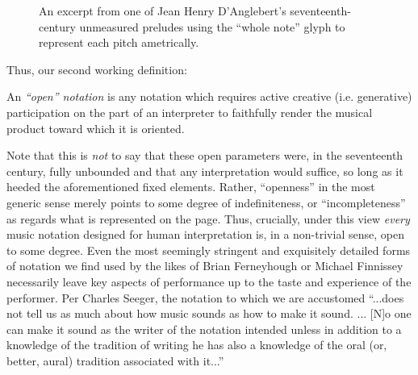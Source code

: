         \begin{figure}
            \centering
            \captionsetup{width=.5\linewidth}
            \caption[An excerpt from one of Jean Henry D'Anglebert's seventeenth-century unmeasured preludes using the ``whole note'' glyph to represent each pitch ametrically.]{An excerpt from one of Jean Henry D'Anglebert's seventeenth-century unmeasured preludes using the ``whole note'' glyph to represent each pitch ametrically.\footnotemark}
            \label{fig:nonmesure}
        \end{figure}

    Thus, our second working definition:

        \begin{smallquote}
        An \textit{``open'' notation} is any notation which requires active creative (i.e. generative) participation on the part of an interpreter to faithfully render the musical product toward which it is oriented.
        \end{smallquote}



    Note that this is \textit{not} to say that these open parameters were, in the seventeenth century, fully unbounded and that any interpretation would suffice, so long as it heeded the aforementioned fixed elements. Rather, ``openness'' in the most generic sense merely points to some degree of indefiniteness, or ``incompleteness'' as regards what is represented on the page. Thus, crucially, under this view \textit{every} music notation designed for human interpretation is, in a non-trivial sense, open to some degree. Even the most seemingly stringent and exquisitely detailed forms of notation we find used by the likes of Brian Ferneyhough or Michael Finnissey necessarily leave key aspects of performance up to the taste and experience of the performer. Per Charles Seeger, the notation to which we are accustomed ``...does not tell us as much about how music sounds as how to make it sound. ... [N]o one can make it sound as the writer of the notation intended unless in addition to a knowledge of the tradition of writing he has also a knowledge of the oral (or, better, aural) tradition associated with it...''\autocite{Seeger_1958}

